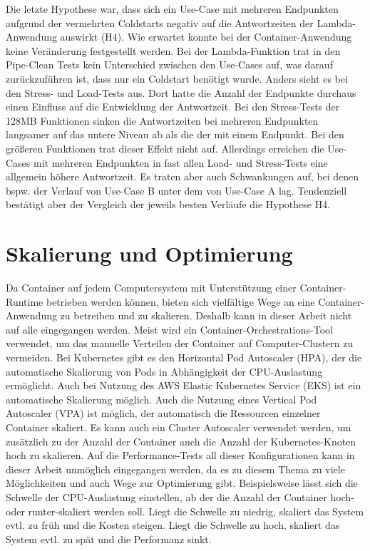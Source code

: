 Die letzte Hypothese war, dass sich ein Use-Case mit mehreren Endpunkten aufgrund der vermehrten Coldstarts negativ auf die Antwortzeiten der Lambda-Anwendung auswirkt (H4). Wie erwartet konnte bei der Container-Anwendung keine Veränderung festgestellt werden. Bei der Lambda-Funktion trat in den Pipe-Clean Tests kein Unterschied zwischen den Use-Cases auf, was darauf zurückzuführen ist, dass nur ein Coldstart benötigt wurde. 
Anders sieht es bei den Stress- und Load-Tests aus. Dort hatte die Anzahl der Endpunkte durchaus einen Einfluss auf die Entwicklung der Antwortzeit. Bei den Stress-Tests der 128MB Funktionen sinken die Antwortzeiten bei mehreren Endpunkten langsamer auf das untere Niveau ab als die der mit einem Endpunkt. Bei den größeren Funktionen trat dieser Effekt nicht auf. Allerdings erreichen die Use-Cases mit mehreren Endpunkten in fast allen Load- und Stress-Tests eine allgemein höhere Antwortzeit. Es traten aber auch Schwankungen auf, bei denen bspw. der Verlauf von Use-Case B unter dem von Use-Case A lag. Tendenziell bestätigt aber der Vergleich der jeweils besten Verläufe die Hypothese H4.

\section{Skalierung und Optimierung}
Da Container auf jedem Computersystem mit Unterstützung einer Container-Runtime betrieben werden können, bieten sich vielfältige Wege an eine Container-Anwendung zu betreiben und zu skalieren. Deshalb kann in dieser Arbeit nicht auf alle eingegangen werden. Meist wird ein Container-Orchestrations-Tool verwendet, um das manuelle Verteilen der Container auf Computer-Clustern zu vermeiden. Bei Kubernetes gibt es den Horizontal Pod Autoscaler (HPA), der die automatische Skalierung von Pods in Abhängigkeit der CPU-Auslastung ermöglicht\cite{noauthor_horizontal_nodate-1}. Auch bei Nutzung des AWS Elastic Kubernetes Service (EKS) ist ein automatische Skalierung möglich\cite{noauthor_horizontal_nodate}. Auch die Nutzung eines Vertical Pod Autoscaler (VPA) ist möglich, der automatisch die Ressourcen einzelner Container skaliert\cite{noauthor_vertical_nodate}. Es kann auch ein Cluster Autoscaler verwendet werden, um zusätzlich zu der Anzahl der Container auch die Anzahl der Kubernetes-Knoten hoch zu skalieren\cite{noauthor_cluster_nodate}.
Auf die Performance-Tests all dieser Konfigurationen kann in dieser Arbeit unmöglich eingegangen werden, da es zu diesem Thema zu viele Möglichkeiten und auch Wege zur Optimierung gibt. Beispielsweise lässt sich die Schwelle der CPU-Auslastung einstellen, ab der die Anzahl der Container hoch- oder runter-skaliert werden soll. Liegt die Schwelle zu niedrig, skaliert das System evtl. zu früh und die Kosten steigen. Liegt die Schwelle zu hoch, skaliert das System evtl. zu spät und die Performanz sinkt.

